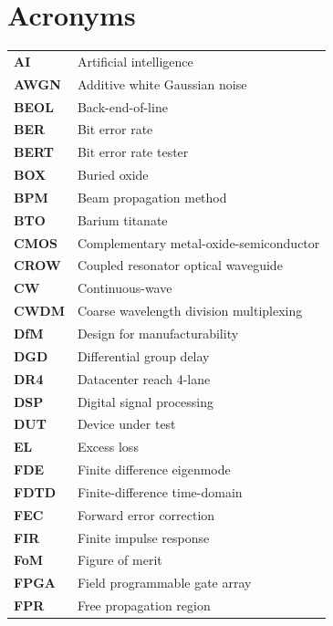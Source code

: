 \chapter*{Acronyms}

\begin{longtable}{@{}p{} p{}@{}}
    \textbf{AI}  & Artificial intelligence  \\
    \textbf{AWGN}  & Additive white Gaussian noise  \\
    \textbf{BEOL}  & Back-end-of-line \\
    \textbf{BER}  & Bit error rate \\
    \textbf{BERT}  & Bit error rate tester \\
    \textbf{BOX}  & Buried oxide \\
    \textbf{BPM}  & Beam propagation method \\
    \textbf{BTO}  & Barium titanate\\
    \textbf{CMOS} & Complementary metal-oxide-semiconductor \\
    \textbf{CROW} & Coupled resonator optical waveguide  \\
    \textbf{CW} & Continuous-wave  \\
    \textbf{CWDM} & Coarse wavelength division multiplexing  \\
    \textbf{DfM} & Design for manufacturability \\
    \textbf{DGD} & Differential group delay \\
    \textbf{DR4} & Datacenter reach 4-lane \\
    \textbf{DSP} & Digital signal processing \\
    \textbf{DUT} & Device under test \\
    \textbf{EL} & Excess loss \\
    \textbf{FDE}  & Finite difference eigenmode \\
    \textbf{FDTD}  & Finite-difference time-domain \\
    \textbf{FEC}  & Forward error correction \\
    \textbf{FIR}  & Finite impulse response  \\
    \textbf{FoM}  & Figure of merit \\
    \textbf{FPGA}  & Field programmable gate array \\
    \textbf{FPR}  & Free propagation region \\

\end{longtable}
